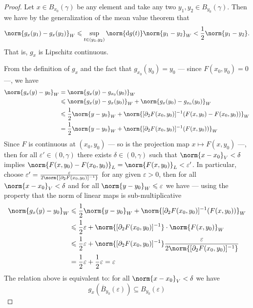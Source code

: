 \begin{proof}
  Let \(x \in B_{x_0}(\gamma)\) be any element and take any two \(y_1, y_2 \in
  B_{y_0}(\gamma)\). Then we have by the generalization of the mean value theorem
  that
  \[
    \norm{g_x(y_1) - g_x(y_{2})}_{W} \leq \sup_{t \in (y_1, y_2)} \norm{\diff g(t)}
    \norm{y_1 - y_2}_W < \frac{1}{2} \norm{y_1 - y_2}.
  \]
  That is, \(g_x\) is Lipschitz continuous.

  From the definition of \(g_x\) and the fact that \(g_{x_0}(y_0) = y_0\) ---
  since \(F(x_0, y_0) = 0\) ---, we have
  \begin{align*}
    \norm{g_x(y) - y_0}_W
    &= \norm{g_x(y) - g_{x_0}(y_0)}_W \\
    &\leq \norm{g_x(y) - g_{x}(y_0)}_W + \norm{g_x(y_0) - g_{x_0}(y_0)}_W \\
    &\leq \frac{1}{2} \norm{y - y_0}_W + \norm{[\partial_2F(x_0, y_0)]^{-1}(F(x, y_0) -
      F(x_0, y_0))}_W \\
    &= \frac{1}{2} \norm{y - y_0}_W
      + \norm{[\partial_{2}F(x_{0}, y_{0})]^{-1}(F(x, y_0))}_W
  \end{align*}
  Since \(F\) is continuous at \((x_{0}, y_0)\) --- so is the projection
  map \(x \mapsto F(x, y_0)\) ---, then for all \(\varepsilon' \in (0, \gamma)\) there
  exists \(\delta \in (0, \gamma)\) such that \(\norm{x - x_0}_V < \delta\) implies \(\norm{F(x, y_0) -
    F(x_0, y_0)}_L = \norm{F(x, y_0)}_L < \varepsilon'\). In particular, choose \(\varepsilon' =
  \frac{\varepsilon}{2 \norm{[\partial_{2}F(x_0, y_0)]^{-1}}}\) for any given \(\varepsilon > 0\), then for
  all \(\norm{x - x_0}_V < \delta\) and for all \(\norm{y - y_0}_W \leq \varepsilon\) we have --- using
  the property that the norm of linear maps is sub-multiplicative
  \begin{align*}
    \norm{g_x(y) - y_0}_{W}
    &\leq \frac{1}{2} \norm{y - y_0}_{W} + \norm{[\partial_2F(x_0, y_0)]^{-1}(F(x, y_0))}_W
    \\
    &\leq \frac{1}{2} \varepsilon + \norm{[\partial_2F(x_0, y_0)]^{-1}} \cdot \norm{F(x, y_0)}_W
    \\
    &\leq \frac{1}{2}\varepsilon
      + \norm{[\partial_2F(x_0, y_0)]^{-1}} \frac{\varepsilon}{2 \norm{[\partial_2F(x_0, y_0)]^{-1}}}
    \\
    &= \frac{1}{2} \varepsilon + \frac{1}{2}\varepsilon = \varepsilon
  \end{align*}
  The relation above is equivalent to: for all \(\norm{x - x_0}_V < \delta\) we have
  \[
    g_x(\overline{B}_{y_0}(\varepsilon)) \subseteq B_{y_0}(\varepsilon)
  \]


\end{proof}
